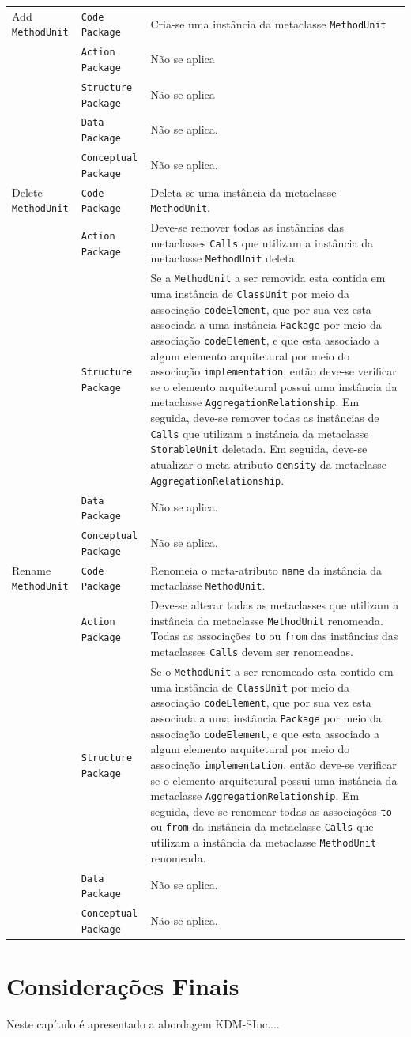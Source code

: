 \begin{longtable}{ | m{1.9cm} | m{3.57cm}| m{9.3cm} | }
 Add \texttt{MethodUnit} & \texttt{Code Package} & Cria-se uma instância da metaclasse \texttt{MethodUnit}\tabularnewline
\cline{2-3} 
\cline{2-3} 
 & \texttt{Action Package} & Não se aplica \tabularnewline
 \cline{2-3} 
 & \texttt{Structure Package} & Não se aplica \tabularnewline
\cline{2-3} 
 & \texttt{Data Package} & Não se aplica. \tabularnewline
\cline{2-3} 
 & \texttt{Conceptual Package} & Não se aplica. \tabularnewline
\hline 
 Delete \texttt{MethodUnit} & \texttt{Code Package} & Deleta-se uma instância da metaclasse \texttt{MethodUnit}.\tabularnewline
\cline{2-3} 
& \texttt{Action Package} & Deve-se remover todas as instâncias das metaclasses \texttt{Calls} que utilizam a instância da metaclasse \texttt{MethodUnit} deleta. \tabularnewline
\cline{2-3}
& \texttt{Structure Package} & Se a \texttt{MethodUnit} a ser removida esta contida em uma instância de \texttt{ClassUnit} por meio da associação \texttt{codeElement}, que por sua vez esta associada a uma instância \texttt{Package} por meio da associação \texttt{codeElement}, e que esta associado a algum elemento arquitetural por meio do associação \texttt{implementation}, então deve-se verificar se o elemento arquitetural possui uma instância da metaclasse \texttt{AggregationRelationship}. Em seguida, deve-se remover todas as instâncias de \texttt{Calls} que utilizam a instância da metaclasse \texttt{StorableUnit} deletada. Em seguida, deve-se atualizar o meta-atributo \texttt{density} da metaclasse \texttt{AggregationRelationship}. \tabularnewline
\cline{2-3}
& \texttt{Data Package} & Não se aplica. \tabularnewline
\cline{2-3}
& \texttt{Conceptual Package} & Não se aplica. \tabularnewline
\hline
Rename \texttt{MethodUnit} & \texttt{Code Package} & Renomeia o meta-atributo \texttt{name} da instância da metaclasse \texttt{MethodUnit}.\tabularnewline
\cline{2-3}
& \texttt{Action Package} & Deve-se alterar todas as metaclasses que utilizam a instância da metaclasse \texttt{MethodUnit} renomeada. Todas as associações \texttt{to} ou \texttt{from} das instâncias das metaclasses \texttt{Calls} devem ser renomeadas. \tabularnewline
\cline{2-3}
& \texttt{Structure Package} & Se o \texttt{MethodUnit} a ser renomeado esta contido em uma instância de \texttt{ClassUnit} por meio da associação \texttt{codeElement}, que por sua vez esta associada a uma instância \texttt{Package} por meio da associação \texttt{codeElement}, e que esta associado a algum elemento arquitetural por meio do associação \texttt{implementation}, então deve-se verificar se o elemento arquitetural possui uma instância da metaclasse \texttt{AggregationRelationship}. Em seguida, deve-se renomear todas as associações \texttt{to} ou \texttt{from} da instância da metaclasse \texttt{Calls} que utilizam a instância da metaclasse \texttt{MethodUnit} renomeada. \tabularnewline
\cline{2-3}
& \texttt{Data Package} & Não se aplica. \tabularnewline
\cline{2-3}
& \texttt{Conceptual Package} & Não se aplica. \tabularnewline
 \end{longtable}

\section{Considerações Finais}

Neste capítulo é apresentado a abordagem KDM-SInc....